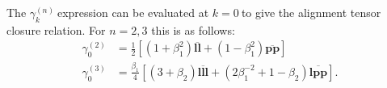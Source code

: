 The \(\gamma_{k}^{(n)}\ \)expression can be evaluated at \(k = 0\ \)to
give the alignment tensor closure relation. For \(n = 2,3\) this is as
follows:
\begin{align}
    \gamma_{0}^{(2)} &= \frac{1}{2}\left\lbrack \left( 1 + \beta_{1}^{2} \right)\overline{\boldsymbol{ll}} + \left( 1 - \beta_{1}^{2} \right)\overline{\boldsymbol{pp}} \right\rbrack\\
    \gamma_{0}^{(3)} &= \frac{\beta_{1}}{4}\left\lbrack \left( 3 + \beta_{2} \right)\overline{\boldsymbol{lll}} + \left( 2\beta_{1}^{- 2} + 1 - \beta_{2} \right)\overline{\boldsymbol{lpp}} \right\rbrack.
\end{align}